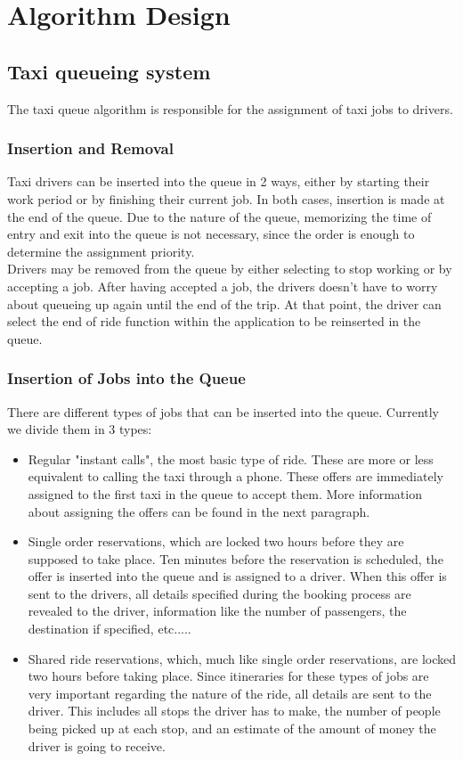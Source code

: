 \section{Algorithm Design}

\subsection{Taxi queueing system}
	The taxi queue algorithm is responsible for the assignment of taxi jobs to drivers. 
	\subsubsection{Insertion and Removal}
		Taxi drivers can be inserted into the queue in 2 ways, either by starting their work period or by finishing their current job. In both cases, insertion is made at the end of 
		the queue. Due to the nature of the queue, memorizing the time of entry and exit into the queue is not necessary, since the order is enough to determine the assignment
		priority. \\
		Drivers may be removed from the queue by either selecting to stop working or by accepting a job. After having accepted a job, the drivers doesn't have to worry about queueing
		up again until the end of the trip. At that point, the driver can select the end of ride function within the application to be reinserted in the queue.\\
	\subsubsection{Insertion of Jobs into the Queue}
		There are different types of jobs that can be inserted into the queue. Currently we divide them in 3 types:
		\begin{itemize}
		\item Regular "instant calls", the most basic type of ride. These are more or less equivalent to calling the taxi through a phone. These offers are immediately assigned to the
		first taxi in the queue to accept them. More information about assigning the offers can be found in the next paragraph.
		\item Single order reservations, which are locked two hours before they are supposed to take place. Ten minutes before the reservation is scheduled, the offer is inserted into the
		queue and is assigned to a driver. When this offer is sent to the drivers, all details specified during the booking process are revealed to the driver, information like the number
		of passengers, the destination if specified, etc..... \newpage
		\item Shared ride reservations, which, much like single order reservations, are locked two hours before taking place. Since itineraries for these types of jobs are very important 
		regarding the nature of the ride, all details are sent to the driver. This includes all stops the driver has to make, the number of people being picked up at each stop, and an estimate
		of the amount of money the driver is going to receive. 
		\end{itemize}
